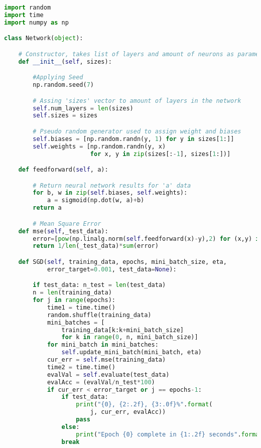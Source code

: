 \documentclass[12pt,twoside]{article}
\begin{document}
\begin{lstlisting}[caption={Plik zawierający sieć - network.py},label={Lst:network_py},language=Python,basicstyle=\scriptsize]
import random
import time
import numpy as np

class Network(object):

    # Constructor, takes list of layers and amount of neurons as parameter
    def __init__(self, sizes):

        #Applying Seed
        np.random.seed(7)

        # Assing 'sizes' vector to amount of layers in the network
        self.num_layers = len(sizes)
        self.sizes = sizes

        # Pseudo random generator used to assign weight and biases 
        self.biases = [np.random.randn(y, 1) for y in sizes[1:]]
        self.weights = [np.random.randn(y, x)
                        for x, y in zip(sizes[:-1], sizes[1:])]

    def feedforward(self, a):

        # Return neural network results for 'a' data
        for b, w in zip(self.biases, self.weights):
            a = sigmoid(np.dot(w, a)+b)
        return a

        # Mean Square Error
    def mse(self,_test_data):
        error=[pow(np.linalg.norm(self.feedforward(x)-y),2) for (x,y) in _test_data]
        return 1/len(_test_data)*sum(error)

    def SGD(self, training_data, epochs, mini_batch_size, eta,
            error_target=0.001, test_data=None):

        if test_data: n_test = len(test_data)
        n = len(training_data)
        for j in range(epochs):
            time1 = time.time()
            random.shuffle(training_data)
            mini_batches = [
                training_data[k:k+mini_batch_size]
                for k in range(0, n, mini_batch_size)]
            for mini_batch in mini_batches:
                self.update_mini_batch(mini_batch, eta)
            cur_err = self.mse(training_data)
            time2 = time.time()
            evalVal = self.evaluate(test_data)
            evalAcc = (evalVal/n_test*100)
            if cur_err < error_target or j == epochs-1:
                if test_data:
                    print("{0}, {2:.2f}, {3:.0f}%".format(
                        j, cur_err, evalAcc))
                    pass
                else:
                    print("Epoch {0} complete in {1:.2f} seconds".format(j, time2-time1))
                break


\end{lstlisting}
\end{document}
